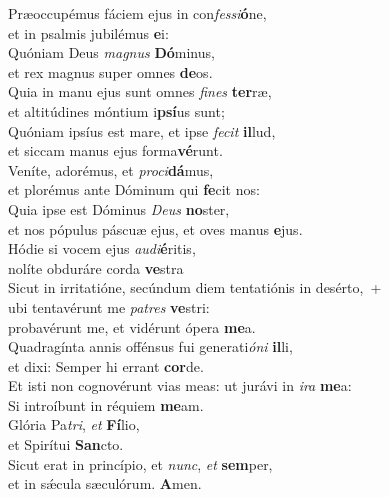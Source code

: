 \evenverse Præoccupémus fáciem ejus in con\textit{fes}\textit{si}\textbf{ó}ne,~\*\\
\evenverse et in psalmis jubilémus \textbf{e}i:\\
\oddverse Quóniam Deus \textit{ma}\textit{gnus} \textbf{Dó}minus,~\*\\
\oddverse et rex magnus super omnes \textbf{de}os.\\
\evenverse Quia in manu ejus sunt omnes \textit{fi}\textit{nes} \textbf{ter}ræ,~\*\\
\evenverse et altitúdines móntium i\textbf{psí}us sunt;\\
\oddverse Quóniam ipsíus est mare, et ipse \textit{fe}\textit{cit} \textbf{il}lud,~\*\\
\oddverse et siccam manus ejus forma\textbf{vé}runt.\\
\evenverse Veníte, adorémus, et \textit{pro}\textit{ci}\textbf{dá}mus,~\*\\
\evenverse et plorémus ante Dóminum qui \textbf{fe}cit nos:\\
\oddverse Quia ipse est Dóminus \textit{De}\textit{us} \textbf{no}ster,~\*\\
\oddverse et nos pópulus páscuæ ejus, et oves manus \textbf{e}jus.\\
\evenverse Hódie si vocem ejus \textit{au}\textit{di}\textbf{é}ritis,~\*\\
\evenverse nolíte obduráre corda \textbf{ve}stra\\
\oddverse Sicut in irritatióne, secúndum diem tentatiónis in desérto,~+\\
\oddverse  ubi tentavérunt me \textit{pa}\textit{tres} \textbf{ve}stri:~\*\\
\oddverse probavérunt me, et vidérunt ópera \textbf{me}a.\\
\evenverse Quadragínta annis offénsus fui generati\textit{ó}\textit{ni} \textbf{il}li,~\*\\
\evenverse et dixi: Semper hi errant \textbf{cor}de.\\
\oddverse Et isti non cognovérunt vias meas: ut jurávi in \textit{i}\textit{ra} \textbf{me}a:~\*\\
\oddverse Si introíbunt in réquiem \textbf{me}am.\\
\evenverse Glória Pa\textit{tri}, \textit{et} \textbf{Fí}lio,~\*\\
\evenverse et Spirítui \textbf{San}cto.\\
\oddverse Sicut erat in princípio, et \textit{nunc}, \textit{et} \textbf{sem}per,~\*\\
\oddverse et in sǽcula sæculórum. \textbf{A}men.\\
